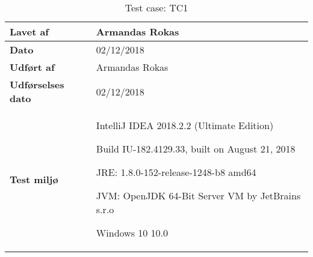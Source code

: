 \documentclass[class=article, crop=false]{standalone}
\makeatletter
\let\savespace\@minipagetrue
\makeatother
\begin{document}
\begin{table}[H]
\begin{tabularx}{\textwidth}{|l|X|}
            \textbf{Lavet af} & Armandas Rokas \\ \hline
            \textbf{Dato} & 02/12/2018 \\ \hline
            \textbf{Udført af } & Armandas Rokas \\ \hline
            \textbf{Udførselses dato}  & 02/12/2018 \\ \hline
            \textbf{Test miljø}  &  \savespace \begin{compactitem}
                                                   \item IntelliJ IDEA 2018.2.2 (Ultimate Edition)
                                                   \item Build IU-182.4129.33, built on August 21, 2018
                                                   \item JRE: 1.8.0-152-release-1248-b8 amd64
                                                   \item JVM: OpenJDK 64-Bit Server VM by JetBrains s.r.o
                                                   \item Windows 10 10.0
            \end{compactitem} \\ \hline
        \end{tabularx}
        \caption{Test case: TC1}

    \end{table}
\end{document}
